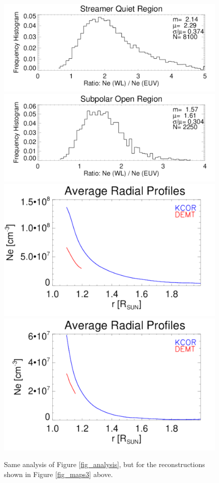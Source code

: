\documentclass[baaa]{baaa}
\begin{document}
\begin{figure}[!ht]
  \centering
  \includegraphics[width=\columnwidth]{comparison_KCOR-Tom_vs_DEMT_CR2198_Lopt_54imag-Quiet-region1_range1105-1195_Rsun.pdf}
  \includegraphics[width=\columnwidth]{comparison_KCOR-Tom_vs_DEMT_CR2198_Lopt_54imag-Open-region_N_range1105-1155_Rsun.pdf}\\
  \includegraphics[width=0.75\columnwidth]{Average_Radial_Profiles_KCOR-Tom_vs_DEMT_CR2198_Lopt_54imag-Quiet-region1.pdf}
  \hskip 2cm
  \includegraphics[width=0.75\columnwidth]{Average_Radial_Profiles_KCOR-Tom_vs_DEMT_CR2198_Lopt_54imag-Open-region_N.pdf}
  \caption{Same analysis of Figure \ref{fig_analysis}, but for the reconstructions shown in Figure \ref{fig_maps3} above.}
  \label{fig_analysis3}
\end{figure}
\end{document}
